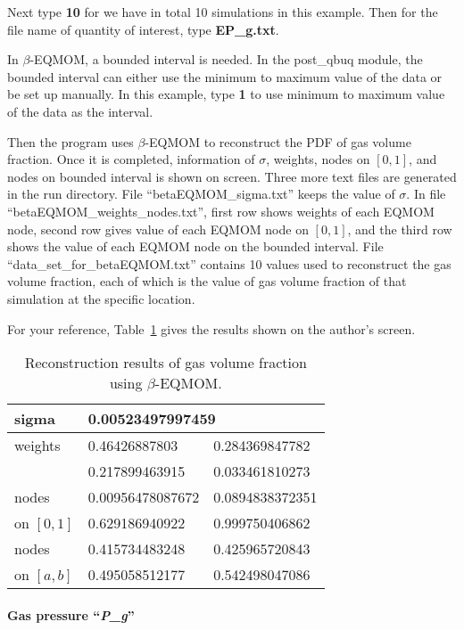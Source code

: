 \documentclass[a4paper,12pt,titlepage]{article}
\begin{document}
Next type \textbf{10} for we have in total 10 simulations in this example. Then
for the file name of quantity of interest, type \textbf{EP\_g.txt}.

In $\beta$-EQMOM, a bounded interval is needed. In the post\_qbuq module, the 
bounded interval can either use the minimum to maximum value of the data or be
set up manually. In this example, type \textbf{1} to use minimum to maximum
value of the data as the interval.

Then the program uses $\beta$-EQMOM to reconstruct the PDF of gas volume 
fraction. Once it is completed, information of $\sigma$, weights, nodes on 
$[0,1]$, and nodes on bounded interval is shown on screen. Three more text files
are generated in the run directory. File ``betaEQMOM\_sigma.txt'' keeps the 
value of $\sigma$. In file ``betaEQMOM\_weights\_nodes.txt'', first row shows
weights of each EQMOM node, second row gives value of each EQMOM node on 
$[0,1]$, and the third row shows the value of each EQMOM node on the bounded
interval. File ``data\_set\_for\_betaEQMOM.txt'' contains 10 values used to 
reconstruct the gas volume fraction, each of which is the value of gas volume
fraction of that simulation at the specific location.

For your reference, Table~\ref{tab:ReconEPg} gives the results shown on the 
author's screen.

\begin{table}[htp]
 \centering
 \begin{tabular}{l|ll} \hline
  sigma       & \multicolumn{2}{l}{0.00523497997459} \\ \hline
  weights     & 0.46426887803    & 0.284369847782    \\ 
              & 0.217899463915   & 0.033461810273    \\ \hline
  nodes       & 0.00956478087672 & 0.0894838372351   \\
  on $[0, 1]$ & 0.629186940922   & 0.999750406862    \\ \hline
  nodes       & 0.415734483248   & 0.425965720843    \\ 
  on $[a, b]$ & 0.495058512177   & 0.542498047086    \\ \hline
 \end{tabular}
 \caption{Reconstruction results of gas volume fraction using $\beta$-EQMOM.}
 \label{tab:ReconEPg}
\end{table}

\paragraph{Gas pressure ``\emph{P\_g}''}\mbox{}\\
\label{sec:ReconPg}
\end{document}
